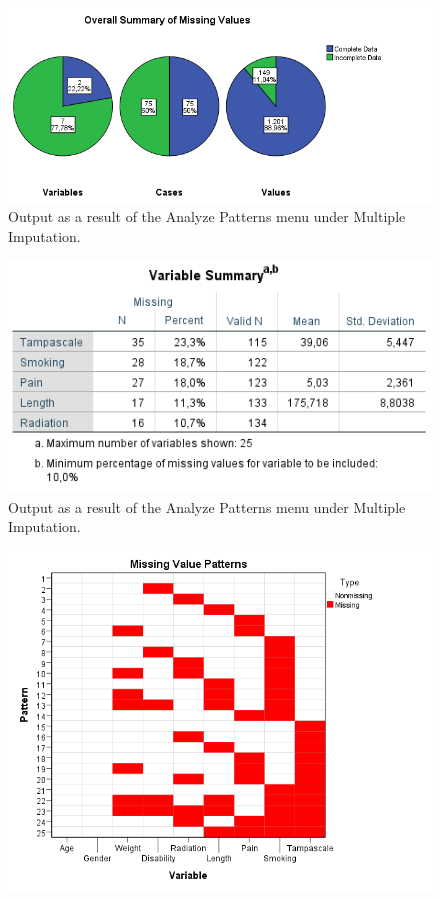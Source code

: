 \documentclass[]{book}
\begin{document}
\begin{figure}

{\centering \includegraphics[width=0.9\linewidth]{images/fig2.6a} 

}

\caption{Output as a result of the Analyze Patterns menu under Multiple Imputation.}\label{fig:fig2-6}
\end{figure}\begin{figure}

{\centering \includegraphics[width=0.9\linewidth]{images/fig2.6b} 

}

\caption{Output as a result of the Analyze Patterns menu under Multiple Imputation.}\label{fig:fig2-6}
\end{figure}\begin{figure}

{\centering \includegraphics[width=0.9\linewidth]{images/fig2.6c} 

}
\end{figure}
\end{document}
